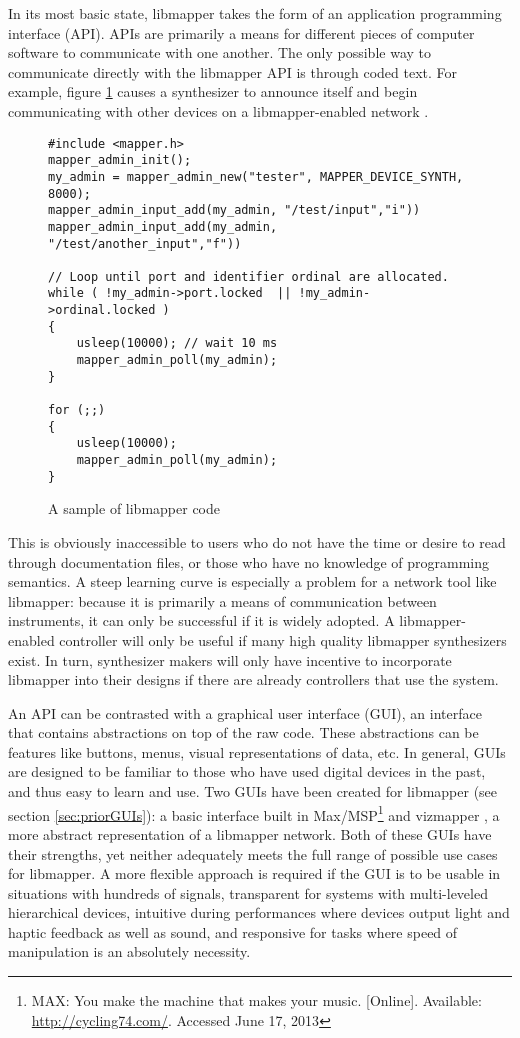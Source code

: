 In its most basic state, libmapper takes the form of an application programming interface (API). APIs are primarily a means for different pieces of computer software to communicate with one another. The only possible way to communicate directly with the libmapper API is through coded text. For example, figure \ref{fig:libmapper_code} causes a synthesizer to announce itself and begin communicating with other devices on a libmapper-enabled network .

\begin{figure}[ht!]
\begin{lstlisting}[]
#include <mapper.h>
mapper_admin_init();
my_admin = mapper_admin_new("tester", MAPPER_DEVICE_SYNTH, 8000); 
mapper_admin_input_add(my_admin, "/test/input","i")) 
mapper_admin_input_add(my_admin, "/test/another_input","f"))

// Loop until port and identifier ordinal are allocated. 
while ( !my_admin->port.locked	|| !my_admin->ordinal.locked )
{
	usleep(10000); // wait 10 ms 
	mapper_admin_poll(my_admin);
}

for (;;) 
{
	usleep(10000);
	mapper_admin_poll(my_admin); 
}
\end{lstlisting}
\caption{A sample of libmapper code}
\label{fig:libmapper_code}
\end{figure}

This is obviously inaccessible to users who do not have the time or desire to read through documentation files, or those who have no knowledge of programming semantics. A steep learning curve is especially a problem for a network tool like libmapper: because it is primarily a means of communication between instruments, it can only be successful if it is widely adopted. A libmapper-enabled controller will only be useful if many high quality libmapper synthesizers exist. In turn, synthesizer makers will only have incentive to incorporate libmapper into their designs if there are already controllers that use the system. 

An API can be contrasted with a graphical user interface (GUI), an interface that contains abstractions on top of the raw code. These abstractions can be features like buttons, menus, visual representations of data, etc. In general, GUIs are designed to be familiar to those who have used digital devices in the past, and thus easy to learn and use. Two GUIs have been created for libmapper (see section \ref{sec:priorGUIs}): a basic interface built in Max/MSP\footnote{MAX: You make the machine that makes your music. [Online]. Available: \url{http://cycling74.com/}. Accessed June 17, 2013} and vizmapper \cite{vizmapper}, a more abstract representation of a libmapper network. Both of these GUIs have their strengths, yet neither adequately meets the full range of possible use cases for libmapper. A more flexible approach is required if the GUI is to be usable in situations with hundreds of signals, transparent for systems with multi-leveled hierarchical devices, intuitive during performances where devices output light and haptic feedback as well as sound, and responsive for tasks where speed of manipulation is an absolutely necessity. 


